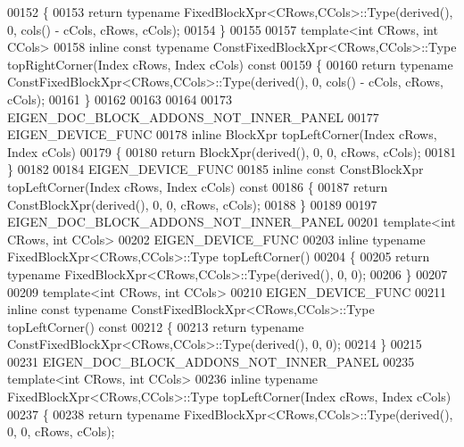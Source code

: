 \begin{DoxyCode}
00152 \{
00153   \textcolor{keywordflow}{return} \textcolor{keyword}{typename} FixedBlockXpr<CRows,CCols>::Type(derived(), 0, cols() - cCols, cRows, cCols);
00154 \}
00155 
00157 \textcolor{keyword}{template}<\textcolor{keywordtype}{int} CRows, \textcolor{keywordtype}{int} CCols>
00158 \textcolor{keyword}{inline} \textcolor{keyword}{const} \textcolor{keyword}{typename} ConstFixedBlockXpr<CRows,CCols>::Type topRightCorner(Index cRows, Index cCols)\textcolor{keyword}{ const}
00159 \textcolor{keyword}{}\{
00160   \textcolor{keywordflow}{return} \textcolor{keyword}{typename} ConstFixedBlockXpr<CRows,CCols>::Type(derived(), 0, cols() - cCols, cRows, cCols);
00161 \}
00162 
00163 
00164 
00173 EIGEN\_DOC\_BLOCK\_ADDONS\_NOT\_INNER\_PANEL
00177 EIGEN\_DEVICE\_FUNC
00178 \textcolor{keyword}{inline} BlockXpr topLeftCorner(Index cRows, Index cCols)
00179 \{
00180   \textcolor{keywordflow}{return} BlockXpr(derived(), 0, 0, cRows, cCols);
00181 \}
00182 
00184 EIGEN\_DEVICE\_FUNC
00185 \textcolor{keyword}{inline} \textcolor{keyword}{const} ConstBlockXpr topLeftCorner(Index cRows, Index cCols)\textcolor{keyword}{ const}
00186 \textcolor{keyword}{}\{
00187   \textcolor{keywordflow}{return} ConstBlockXpr(derived(), 0, 0, cRows, cCols);
00188 \}
00189 
00197 EIGEN\_DOC\_BLOCK\_ADDONS\_NOT\_INNER\_PANEL
00201 \textcolor{keyword}{template}<\textcolor{keywordtype}{int} CRows, \textcolor{keywordtype}{int} CCols>
00202 EIGEN\_DEVICE\_FUNC
00203 \textcolor{keyword}{inline} \textcolor{keyword}{typename} FixedBlockXpr<CRows,CCols>::Type topLeftCorner()
00204 \{
00205   \textcolor{keywordflow}{return} \textcolor{keyword}{typename} FixedBlockXpr<CRows,CCols>::Type(derived(), 0, 0);
00206 \}
00207 
00209 \textcolor{keyword}{template}<\textcolor{keywordtype}{int} CRows, \textcolor{keywordtype}{int} CCols>
00210 EIGEN\_DEVICE\_FUNC
00211 \textcolor{keyword}{inline} \textcolor{keyword}{const} \textcolor{keyword}{typename} ConstFixedBlockXpr<CRows,CCols>::Type topLeftCorner()\textcolor{keyword}{ const}
00212 \textcolor{keyword}{}\{
00213   \textcolor{keywordflow}{return} \textcolor{keyword}{typename} ConstFixedBlockXpr<CRows,CCols>::Type(derived(), 0, 0);
00214 \}
00215 
00231 EIGEN\_DOC\_BLOCK\_ADDONS\_NOT\_INNER\_PANEL
00235 \textcolor{keyword}{template}<\textcolor{keywordtype}{int} CRows, \textcolor{keywordtype}{int} CCols>
00236 \textcolor{keyword}{inline} \textcolor{keyword}{typename} FixedBlockXpr<CRows,CCols>::Type topLeftCorner(Index cRows, Index cCols)
00237 \{
00238   \textcolor{keywordflow}{return} \textcolor{keyword}{typename} FixedBlockXpr<CRows,CCols>::Type(derived(), 0, 0, cRows, cCols);

\end{DoxyCode}
